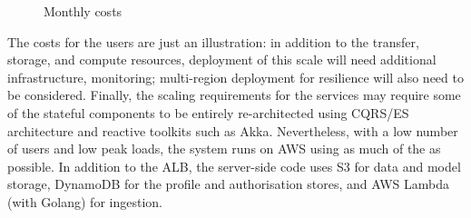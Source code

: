 \begin{figure}[h]
  \caption{Monthly costs}
  \label{plot:monthly-costs}
\end{figure}

The costs for the  users are just an illustration: in addition to the transfer, storage, and compute resources, deployment of this scale will need additional infrastructure, monitoring; multi-region deployment for resilience will also need to be considered. Finally, the scaling requirements for the services may require some of the stateful components to be entirely re-architected using CQRS/ES architecture and reactive toolkits such as Akka\cite{akka}. Nevertheless, with a low number of users and low peak loads, the system runs on AWS using as much of the  as possible. In addition to the ALB, the server-side code uses S3 for data and model storage, DynamoDB for the profile and authorisation stores, and AWS Lambda (with Golang) for ingestion. 

